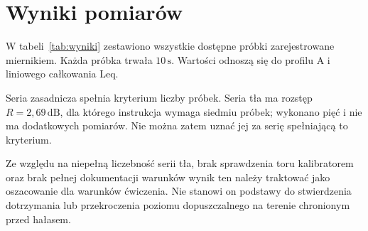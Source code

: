 \section{Wyniki pomiarów}
\label{sec:wyniki}
W tabeli~\ref{tab:wyniki} zestawiono wszystkie dostępne próbki
zarejestrowane miernikiem. Każda próbka trwała $10\,\mathrm{s}$.
Wartości odnoszą się do profilu A i liniowego całkowania Leq.
\begin{table}[htbp]
 \centering
 \caption{Równoważne poziomy dźwięku A w próbkach $10\,\mathrm{s}$.}
 \label{tab:wyniki}
 
\end{table}


\begin{table}[htbp]
 \centering
 \caption{Opracowanie serii i sprawdzenie wymaganej liczby próbek.}
 \label{tab:opracowanie}
 
\end{table}
Seria zasadnicza spełnia kryterium liczby próbek. Seria tła ma
rozstęp $R=2{,}69\,\mathrm{dB}$, dla którego instrukcja wymaga
siedmiu próbek; wykonano pięć i nie ma dodatkowych pomiarów.
Nie można zatem uznać jej za serię spełniającą to kryterium.


Ze względu na niepełną liczebność serii tła, brak sprawdzenia toru
kalibratorem oraz brak pełnej dokumentacji warunków wynik ten
należy traktować jako oszacowanie dla warunków ćwiczenia.
Nie stanowi on podstawy do stwierdzenia dotrzymania lub przekroczenia
poziomu dopuszczalnego na terenie chronionym przed hałasem.
